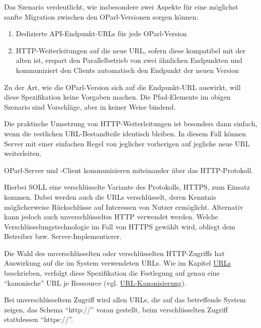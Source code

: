 \documentclass[,a4paper]{article}
\begin{document}
Das Szenario verdeutlicht, wie insbesondere zwei Aspekte für eine
möglichst sanfte Migration zwischen den OParl-Versionen sorgen können:

\begin{enumerate}
\def\labelenumi{\arabic{enumi}.}
\item
  Dedizierte API-Endpunkt-URLs für jede OParl-Version
\item
  HTTP-Weiterleitungen auf die neue URL, sofern diese kompatibel mit der
  alten ist, erspart den Parallelbetrieb von zwei ähnlichen Endpunkten
  und kommuniziert den Clients automatisch den Endpunkt der neuen
  Version
\end{enumerate}

Zu der Art, wie die OParl-Version sich auf die Endpunkt-URL auswirkt,
will diese Spezifikation keine Vorgaben machen. Die Pfad-Elemente im
obigen Szenario sind Vorschläge, aber in keiner Weise bindend.

Die praktische Umsetzung von HTTP-Weiterleitungen ist besonders dann
einfach, wenn die restlichen URL-Bestandteile identisch bleiben. In
diesem Fall können Server mit einer einfachen Regel von jeglicher
vorherigen auf jegliche neue URL weiterleiten.


OParl-Server und -Client kommunizieren miteinander über das
HTTP-Protokoll.

Hierbei SOLL eine verschlüsselte Variante des Protokolls, HTTPS, zum
Einsatz kommen. Dabei werden auch die URLs verschlüsselt, deren Kenntnis
möglicherweise Rückschlüsse auf Interessen von Nutzer ermöglicht.
Alternativ kann jedoch auch unverschlüsseltes HTTP verwendet werden.
Welche Verschlüsselungstechnologie im Fall von HTTPS gewählt wird,
obliegt dem Betreiber bzw. Server-Implementierer.

Die Wahl des unverschlüsselten oder verschlüsselten HTTP-Zugriffs hat
Auswirkung auf die im System verwendeten URLs. Wie im Kapitel
\hyperref[urls]{URLs} beschrieben, verfolgt diese Spezifikation die
Festlegung auf genau eine ``kanonische'' URL je Ressource (vgl.
\hyperref[urlux5fkanonisierung]{URL-Kanonisierung}).

Bei unverschlüsseltem Zugriff wird allen URLs, die auf das betreffende
System zeigen, das Schema ``http://'' voran gestellt, beim
verschlüsselten Zugriff stattdessen ``https://''.
\end{document}

